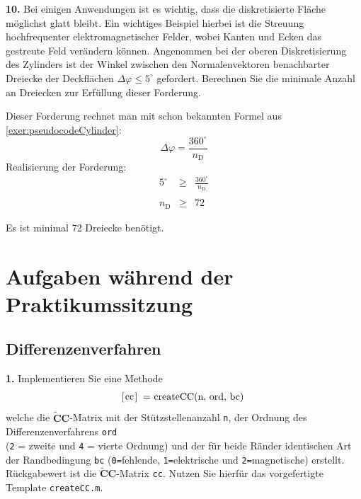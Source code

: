 \documentclass[Protokollheft.tex]{subfiles}
\begin{document}
    \begin{framed}
	\noindent \textbf{10.} Bei einigen Anwendungen ist es wichtig, dass die diskretisierte Fläche möglichst glatt bleibt. Ein
          wichtiges Beispiel hierbei ist die Streuung hochfrequenter elektromagnetischer Felder, wobei
          Kanten und Ecken das gestreute Feld verändern können. Angenommen bei der oberen
          Diskretisierung des Zylinders ist der Winkel zwischen den Normalenvektoren benachbarter Dreiecke der Deckflächen $\Delta \varphi \leq 5^{\circ}$ gefordert.
          Berechnen Sie die minimale Anzahl an Dreiecken zur Erfüllung dieser Forderung.\label{exer:smoothArea}
\end{framed}

	Dieser Forderung rechnet man mit schon bekannten Formel aus \ref{exer:pseudocodeCylinder}:
		$$\Delta \varphi = \frac{360^\circ}{n_\text{D}}$$
	Realisierung der Forderung:
	\begin{eqnarray*}
		5^{\circ} &\geq& \frac{360^\circ}{n_\text{D}}\\
		\\
		n_\text{D} &\geq& 72
	\end{eqnarray*}

	Es ist minimal 72 Dreiecke benötigt.

\section{Aufgaben während der Praktikumssitzung}
{\subsection{Differenzenverfahren}}

        \begin{framed}
	\noindent \textbf{1.} Implementieren Sie eine Methode
                    \begin{align}
                        \lstinline{[cc] = createCC(n, ord, bc)}\; \label{meth:createCC}
                    \end{align}     
                    welche die $\tilde{\textbf{C}}\textbf{C}$-Matrix mit der Stützstellenanzahl \lstinline{n}, der Ordnung des Differenzenverfahrens
                    \lstinline{ord}\\ (\lstinline{2} = zweite und \lstinline{4} = vierte Ordnung) und der für beide Ränder identischen Art der Randbedingung \lstinline{bc} (\lstinline{0=}fehlende, \lstinline{1=}elektrische und  \lstinline{2=}magnetische) erstellt.
                    Rückgabewert ist die $\tilde{\textbf{C}}\textbf{C}$-Matrix \lstinline{cc}. Nutzen Sie hierfür das vorgefertigte Template \lstinline{createCC.m}.\label{exer:createCC}
\end{framed}
\end{document}
